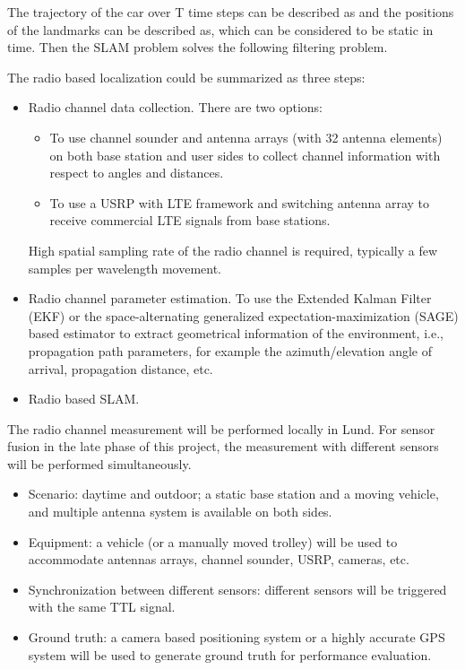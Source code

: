 The trajectory of the car over T time steps can be described as and
the positions of the landmarks can be described as, which can be
considered to be static in time. Then the \gls{SLAM} problem solves
the following filtering problem.

The radio based localization could be summarized as three steps:

\begin{itemize}
\item Radio channel data collection. There are two options: 
  \begin{itemize}
  \item To use channel sounder and antenna arrays (with 32 antenna elements) on both base station and user sides to collect channel information with respect to angles and distances.
  \item To use a USRP with LTE framework and switching antenna array to receive commercial LTE signals from base stations.
  \end{itemize}
High spatial sampling rate of the radio channel is required, typically a few samples per wavelength movement. 
\item Radio channel parameter estimation. To use the Extended Kalman Filter (EKF) or the space-alternating generalized expectation-maximization (SAGE) based estimator to extract geometrical information of the environment, i.e., propagation path parameters, for example the azimuth/elevation angle of arrival, propagation distance, etc. 
\item Radio based SLAM. 
\end{itemize}

The radio channel measurement will be performed locally in Lund. For sensor fusion in the late phase of this project, the measurement with different sensors will be performed simultaneously. 
\begin{itemize}
\item Scenario: daytime and outdoor; a static base station and a moving vehicle, and multiple antenna system is available on both sides. 
\item Equipment: a vehicle (or a manually moved trolley) will be used to accommodate antennas arrays, channel sounder, USRP, cameras, etc.
\item Synchronization between different sensors: different sensors will be triggered with the same TTL signal.
\item Ground truth: a camera based positioning system or a highly accurate GPS system will be used to generate ground truth for performance evaluation.     
\end{itemize}


